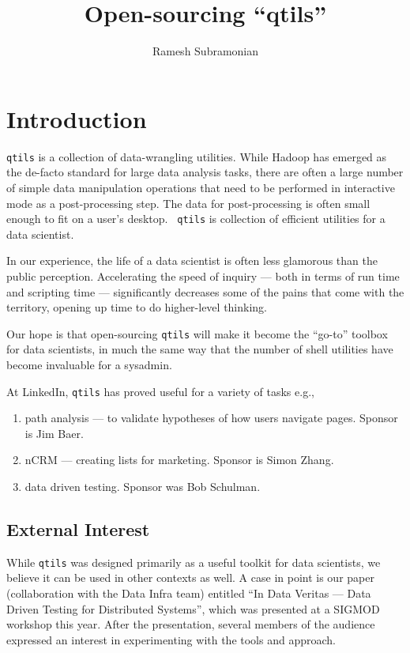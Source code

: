\documentclass[letterpaper]{article}
\begin{document}
\title{Open-sourcing ``qtils''}
\author{ Ramesh Subramonian }
\maketitle
\thispagestyle{fancy}
\lhead{}
\chead{}
\rhead{}
\cfoot{}
\rfoot{{\small \thepage}}

\section{Introduction}

{\tt qtils} is a collection of data-wrangling utilities. While Hadoop has
emerged as the de-facto standard for large data analysis tasks, there are
often a large number of simple data manipulation operations that need to
be performed in interactive mode as a post-processing step. The data for
post-processing is often small enough to fit on a user's desktop. {\tt
  qtils} is collection of efficient utilities for a data scientist.

In our experience, the life of a data scientist is often less glamorous
than the public perception. Accelerating the speed of inquiry --- both
in terms of run time and scripting time --- significantly decreases some
of the pains that come with the territory, opening up time to do
higher-level thinking.

Our hope is that open-sourcing {\tt qtils} will make it become the
``go-to'' toolbox for data scientists, in much the same way that the
number of shell utilities have become invaluable for a sysadmin.

At LinkedIn, {\tt qtils} has proved useful for a variety of tasks e.g.,
\begin{enumerate}
\item path analysis --- to validate hypotheses of how users navigate
pages.  Sponsor is Jim Baer. 
\item nCRM --- creating lists for marketing.  Sponsor is Simon Zhang.
\item data driven testing. Sponsor was Bob Schulman.
\end{enumerate}

\subsection{External Interest}

While {\tt qtils} was designed primarily as a useful toolkit for data
scientists, we believe it can be used in other contexts as well. A case
in point is our paper (collaboration with the Data Infra team) entitled
``In Data Veritas --- Data Driven Testing for Distributed
Systems'', which was presented at a SIGMOD workshop this year. After the
presentation, several members of the audience expressed an interest in
experimenting with the tools and approach.
\end{document}

